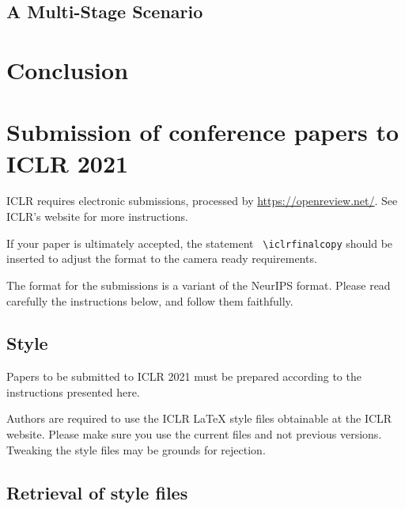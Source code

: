 \documentclass{article}
\begin{document}
\subsection{A Multi-Stage Scenario}
\label{subsec: A Multi-Stage Scenario}

\lipsum[84]

\section{Conclusion}
\label{sec: Conclusion}

\lipsum[20]

\section*{Submission of conference papers to ICLR 2021}

ICLR requires electronic submissions, processed by
\url{https://openreview.net/}. See ICLR's website for more instructions.

If your paper is ultimately accepted, the statement {\tt
  {\textbackslash}iclrfinalcopy} should be inserted to adjust the
format to the camera ready requirements.

The format for the submissions is a variant of the NeurIPS format.
Please read carefully the instructions below, and follow them
faithfully.

\subsection*{Style}

Papers to be submitted to ICLR 2021 must be prepared according to the
instructions presented here.


Authors are required to use the ICLR \LaTeX{} style files obtainable at the
ICLR website. Please make sure you use the current files and
not previous versions. Tweaking the style files may be grounds for rejection.

\subsection*{Retrieval of style files}
\end{document}
